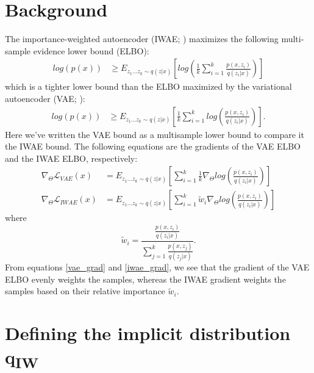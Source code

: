 \documentclass{article} %
\newcommand{\eqname}[1]{\tag*{#1}}
\begin{document}
\section{Background}
The importance-weighted autoencoder (IWAE; \cite{burda2015importance}) maximizes the following multi-sample evidence lower bound (ELBO): 
\begin{align} 
    log(p(x)) &
    \geq E_{z_{1}...z_{k} \sim q(z|x)} \left[log\left(  \frac{1}{k}\sum_{i=1}^k \frac{p(x,z_i)}{q(z_i|x)}  \right)  \right] \label{iwae_elbo}  \eqname{(IWAE ELBO)}
\end{align}
which is a tighter lower bound than the ELBO maximized by the variational autoencoder (VAE; \cite{vae}):
\begin{align}
    log(p(x)) & \geq E_{z_{1}...z_{k} \sim q(z|x)} \left[  \frac{1}{k}\sum_{i=1}^k log\left(\frac{p(x,z_i)}{q(z_i|x)}  \right)  \right]. \label{vae_elbo} \eqname{(VAE ELBO)}
\end{align}
Here we've written the VAE bound as a multisample lower bound to compare it the IWAE bound. The following equations are the gradients of the VAE ELBO and the IWAE ELBO, respectively:
\begin{align} 
    \nabla_{\Theta} \mathcal{L}_{VAE}(x) &= E_{z_{1}...z_{k} \sim q(z|x)} \left[   \sum_{i=1}^k \frac{1}{k} \nabla_{\Theta} log\left(\frac{p(x,z_i)}{q(z_i|x)}  \right)  \right] \label{vae_grad} \\
    \nabla_{\Theta} \mathcal{L}_{IWAE}(x) &= E_{z_{1}...z_{k} \sim q(z|x)} \left[  \sum_{i=1}^k \tilde{w}_i \nabla_{\Theta} log\left(\frac{p(x,z_i)}{q(z_i|x)}  \right)  \right] \label{iwae_grad}
\end{align}
where $$\tilde{w}_i = \frac{\frac{p(x,z_i)}{q(z_i|x)}}{\sum_{j=1}^k \frac{p(x,z_j)}{q(z_j|x)}}.$$
From equations \ref{vae_grad} and \ref{iwae_grad}, we see that the gradient of the VAE ELBO evenly weights the samples, whereas the IWAE gradient weights the samples based on their relative importance $\tilde{w}_i$.




\section{Defining the implicit distribution q\textsubscript{IW}}
\end{document}
